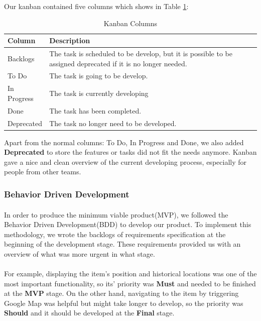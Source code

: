 \documentclass[12pt,a4paper]{article}
\begin{document}
          Our kanban contained five columns which shows in Table \ref{table:Kanban Columns}:
          
          \begin{table}[H]
            \centering
              \begin{tabularx}{\textwidth}{l X}
                \hline
                Column & Description  \\ \hline
                Backlogs & The task is scheduled to be develop, but it is possible to be assigned deprecated if it is no longer needed. \\ 
                To Do & The task is going to be develop.  \\ 
                In Progress & The task is currently developing  \\ 
                Done & The task has been completed.   \\ 
                Deprecated & The task no longer need to be developed.\\                  
                \hline
              \end{tabularx}
              \caption[Table caption text]{Kanban Columns}
              \label{table:Kanban Columns}
          \end{table}
          
          Apart from the normal columns: To Do, In Progress and Done, we also added {\bf Deprecated} to store the features or tasks did not fit the needs anymore. Kanban gave a nice and clean overview of the current developing process, especially for people from other teams.
        
        \subsubsection{Behavior Driven Development}
          \paragraph{}In order to produce the minimum viable product(MVP), we followed the Behavior Driven Development(BDD) to develop our product. To implement this methodology, we wrote the backlogs of requirements specification at the beginning of the development stage. These requirements provided us with an overview of what was more urgent in what stage. 

          \paragraph{}For example, displaying the item's position and historical locations was one of the most important functionality, so its' priority was {\bf Must} and needed to be finished at the {\bf MVP} stage. On the other hand, navigating to the item by triggering Google Map was helpful but might take longer to develop, so the priority was {\bf Should} and it should be developed at the {\bf Final} stage. 
          
\end{document}

